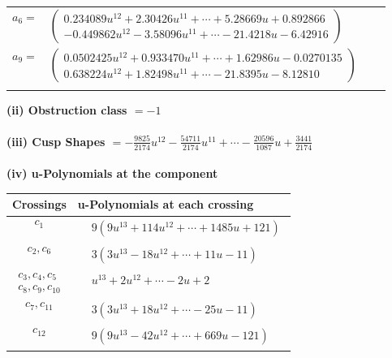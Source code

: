 \documentclass[1p]{elsarticle_modified}
\theoremstyle{definition}
\begin{document}
\begin{tabular}{m{7pt} m{180pt} m{7pt} m{180pt} }
\flushright $a_{6}=$&$\begin{pmatrix}0.234089 u^{12}+2.30426 u^{11}+\cdots+5.28669 u+0.892866\\-0.449862 u^{12}-3.58096 u^{11}+\cdots-21.4218 u-6.42916\end{pmatrix}$ \\
\flushright $a_{9}=$&$\begin{pmatrix}0.0502425 u^{12}+0.933470 u^{11}+\cdots+1.62986 u-0.0270135\\0.638224 u^{12}+1.82498 u^{11}+\cdots-21.8395 u-8.12810\end{pmatrix}$\\&\end{tabular}
\flushleft \textbf{(ii) Obstruction class $= -1$}\\~\\
\flushleft \textbf{(iii) Cusp Shapes $= -\frac{9825}{2174} u^{12}-\frac{54711}{2174} u^{11}+\cdots-\frac{20596}{1087} u+\frac{3441}{2174}$}\\~\\
\newpage\renewcommand{\arraystretch}{1}
\flushleft \textbf{(iv) u-Polynomials at the component}\newline \\
\begin{tabular}{m{50pt}|m{274pt}}
Crossings & \hspace{64pt}u-Polynomials at each crossing \\
\hline $$\begin{aligned}c_{1}\end{aligned}$$&$\begin{aligned}
&9(9 u^{13}+114 u^{12}+\cdots+1485 u+121)
\end{aligned}$\\
\hline $$\begin{aligned}c_{2},c_{6}\end{aligned}$$&$\begin{aligned}
&3(3 u^{13}-18 u^{12}+\cdots+11 u-11)
\end{aligned}$\\
\hline $$\begin{aligned}c_{3},c_{4},c_{5}\\c_{8},c_{9},c_{10}\end{aligned}$$&$\begin{aligned}
&u^{13}+2 u^{12}+\cdots-2 u+2
\end{aligned}$\\
\hline $$\begin{aligned}c_{7},c_{11}\end{aligned}$$&$\begin{aligned}
&3(3 u^{13}+18 u^{12}+\cdots-25 u-11)
\end{aligned}$\\
\hline $$\begin{aligned}c_{12}\end{aligned}$$&$\begin{aligned}
&9(9 u^{13}-42 u^{12}+\cdots+669 u-121)
\end{aligned}$\\
\hline
\end{tabular}\\~\\
\end{document}

